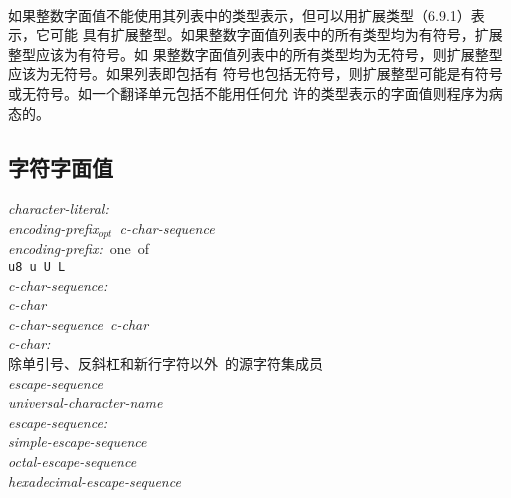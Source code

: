 \paragraph{}
如果整数字面值不能使用其列表中的类型表示，但可以用扩展类型（6.9.1）表示，它可能
具有扩展整型。如果整数字面值列表中的所有类型均为有符号，扩展整型应该为有符号。如
果整数字面值列表中的所有类型均为无符号，则扩展整型应该为无符号。如果列表即包括有
符号也包括无符号，则扩展整型可能是有符号或无符号。如一个翻译单元包括不能用任何允
许的类型表示的字面值则程序为病态的。

\subsection{字符字面值}
\noindent \mbox{\qquad \textit{character-literal:}}                           \\
\mbox{\qquad \qquad \textit{encoding-prefix$_{opt}$
  \qsgl \textit{c-char-sequence}\qsgl}}                                       \\
\noindent \mbox{\qquad \textit{encoding-prefix:} one of}                      \\
\mbox{\qquad \qquad \texttt{u8 u U L}}                                        \\
\noindent \mbox{\qquad \textit{c-char-sequence:}}                             \\
\mbox{\qquad \qquad \textit{c-char}}                                          \\
\mbox{\qquad \qquad \textit{c-char-sequence} \textit{c-char}}                 \\
\noindent \mbox{\qquad \textit{c-char:}}                                      \\
\mbox{\qquad \qquad 除单引号\texttt{\qsgl}、反斜杠\texttt{\bslh}和新行字符以外
  的源字符集成员}                                                             \\
\mbox{\qquad \qquad \textit{escape-sequence}}                                 \\
\mbox{\qquad \qquad \textit{universal-character-name}}                        \\
\noindent \mbox{\qquad \textit{escape-sequence:}}                             \\
\mbox{\qquad \qquad \textit{simple-escape-sequence}}                          \\
\mbox{\qquad \qquad \textit{octal-escape-sequence}}                           \\
\mbox{\qquad \qquad \textit{hexadecimal-escape-sequence}}                     \\
